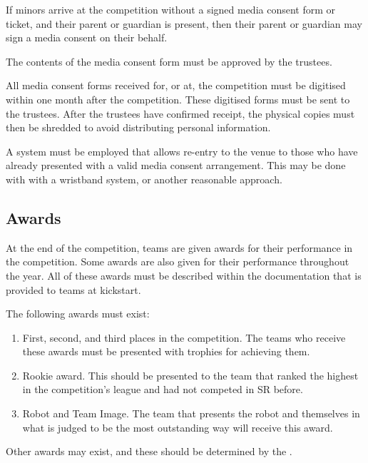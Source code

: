If minors arrive at the competition without a signed media consent form or ticket, and their parent or guardian is present, then their parent or guardian may sign a media consent on their behalf.

The contents of the media consent form must be approved by the trustees.

All media consent forms received for, or at, the competition must be digitised within one month after the competition.  These digitised forms must be sent to the trustees.  After the trustees have confirmed receipt, the physical copies must then be shredded to avoid distributing personal information.

A system must be employed that allows re-entry to the venue to those who have already presented with a valid media consent arrangement.  This may be done with with a wristband system, or another reasonable approach.

\subsection{Awards}

At the end of the competition, teams are given awards for their performance in the competition.  Some awards are also given for their performance throughout the year.  All of these awards must be described within the documentation that is provided to teams at kickstart.

The following awards must exist:
\begin{enumerate}
\item First, second, and third places in the competition.  The teams who receive these awards must be presented with trophies for achieving them.

\item Rookie award.  This should be presented to the team that ranked the highest in the competition's league and had not competed in SR before.

\item Robot and Team Image.  The team that presents the robot and themselves in what is judged to be the most outstanding way will receive this award.
\end{enumerate}
Other awards may exist, and these should be determined by the .

